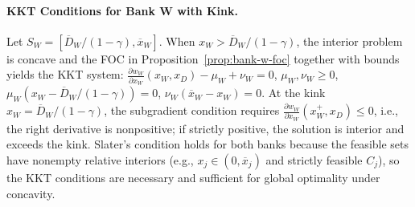 \documentclass[12pt]{article}
\begin{document}
\paragraph{KKT Conditions for Bank W with Kink.}
Let $S_W=[\overline D_W/(1-\gamma),\overline x_W]$. When $x_W>\overline D_W/(1-\gamma)$, the interior problem is concave and the FOC in Proposition~\ref{prop:bank-w-foc} together with bounds yields the KKT system: $\frac{\partial w_W}{\partial x_W}(x_W,x_D) - \mu_W + \nu_W = 0$, $\mu_W,\nu_W\ge 0$, $\mu_W(x_W-\overline D_W/(1-\gamma))=0$, $\nu_W(\overline x_W-x_W)=0$. At the kink $x_W=\overline D_W/(1-\gamma)$, the subgradient condition requires $\frac{\partial w_W}{\partial x_W}(x_W^+,x_D)\le 0$, i.e., the right derivative is nonpositive; if strictly positive, the solution is interior and exceeds the kink. Slater's condition holds for both banks because the feasible sets have nonempty relative interiors (e.g., $x_j\in(0,\overline x_j)$ and strictly feasible $C_j$), so the KKT conditions are necessary and sufficient for global optimality under concavity.
\end{document}

